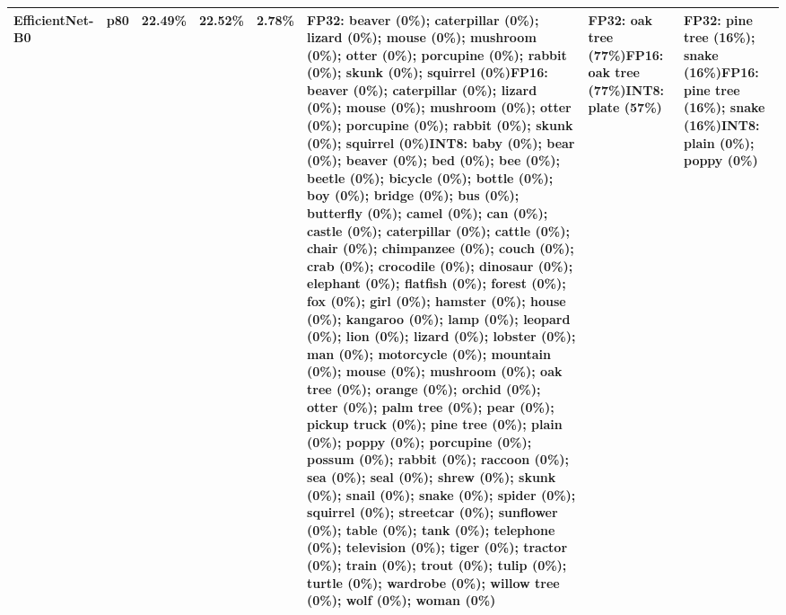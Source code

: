 \begin{longtable}{p{2.8cm} r r r r p{5.0cm} p{4.2cm} p{4.2cm}}
EfficientNet-B0 & p80 & 22.49\% & 22.52\% & 2.78\% & FP32: beaver (0\%); caterpillar (0\%); lizard (0\%); mouse (0\%); mushroom (0\%); otter (0\%); porcupine (0\%); rabbit (0\%); skunk (0\%); squirrel (0\%)\newline FP16: beaver (0\%); caterpillar (0\%); lizard (0\%); mouse (0\%); mushroom (0\%); otter (0\%); porcupine (0\%); rabbit (0\%); skunk (0\%); squirrel (0\%)\newline INT8: baby (0\%); bear (0\%); beaver (0\%); bed (0\%); bee (0\%); beetle (0\%); bicycle (0\%); bottle (0\%); boy (0\%); bridge (0\%); bus (0\%); butterfly (0\%); camel (0\%); can (0\%); castle (0\%); caterpillar (0\%); cattle (0\%); chair (0\%); chimpanzee (0\%); couch (0\%); crab (0\%); crocodile (0\%); dinosaur (0\%); elephant (0\%); flatfish (0\%); forest (0\%); fox (0\%); girl (0\%); hamster (0\%); house (0\%); kangaroo (0\%); lamp (0\%); leopard (0\%); lion (0\%); lizard (0\%); lobster (0\%); man (0\%); motorcycle (0\%); mountain (0\%); mouse (0\%); mushroom (0\%); oak tree (0\%); orange (0\%); orchid (0\%); otter (0\%); palm tree (0\%); pear (0\%); pickup truck (0\%); pine tree (0\%); plain (0\%); poppy (0\%); porcupine (0\%); possum (0\%); rabbit (0\%); raccoon (0\%); sea (0\%); seal (0\%); shrew (0\%); skunk (0\%); snail (0\%); snake (0\%); spider (0\%); squirrel (0\%); streetcar (0\%); sunflower (0\%); table (0\%); tank (0\%); telephone (0\%); television (0\%); tiger (0\%); tractor (0\%); train (0\%); trout (0\%); tulip (0\%); turtle (0\%); wardrobe (0\%); willow tree (0\%); wolf (0\%); woman (0\%) & FP32: oak tree (77\%)\newline FP16: oak tree (77\%)\newline INT8: plate (57\%) & FP32: pine tree (16\%); snake (16\%)\newline FP16: pine tree (16\%); snake (16\%)\newline INT8: plain (0\%); poppy (0\%) \\ \hline

\end{longtable}
